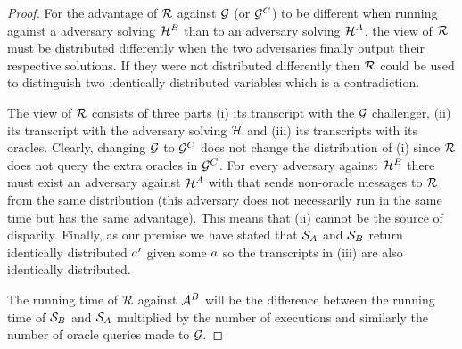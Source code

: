 \begin{proof}

  For the advantage of $\mathcal{R}$ against $\mathcal{G}$ (or $\mathcal{G}^C$) to be different when running against a adversary solving $\mathcal{H}^B$ than to an adversary solving $\mathcal{H}^A$, the view of $\mathcal{R}$ must be distributed differently when the two adversaries finally output their respective solutions.
  If they were not distributed differently then $\mathcal{R}$ could be used to distinguish two identically distributed variables which is a contradiction.

  The view of $\mathcal{R}$ consists of three parts (i) its transcript with the $\mathcal{G}$ challenger, (ii) its transcript with the adversary solving $\mathcal{H}$ and (iii) its transcripts with its oracles.
  Clearly, changing $\mathcal{G}$ to $\mathcal{G}^C$ does not change the distribution of (i) since $\mathcal{R}$ does not query the extra oracles in $\mathcal{G}^C$.
  For every adversary against $\mathcal{H}^B$ there must exist an adversary against $\mathcal{H}^A$ with that sends non-oracle messages to $\mathcal{R}$ from the same distribution (this adversary does not necessarily run in the same time but has the same advantage). This means that (ii) cannot be the source of disparity.
  Finally, as our premise we have stated that $\mathcal{S}_A$ and $\mathcal{S}_B$ return identically distributed $a'$ given some $a$ so the transcripts in (iii) are also identically distributed.

  The running time of $\mathcal{R}$ against $\mathcal{A}^B$ will be the difference between the running time of $\mathcal{S}_B$ and $\mathcal{S}_A$ multiplied by the number of executions and similarly the number of oracle queries made to $\mathcal{G}$.
\end{proof}
